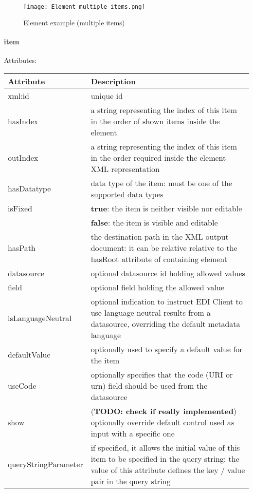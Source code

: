 \begin{figure}[h]
	\caption{Element example (multiple items)}
	\texttt{[image: Element multiple items.png]}
	\centering
\end{figure}


\paragraph{item} \label{item}

Attributes:
\begin{center}
	\begin{tabular}{ | p{} | p{} | }
		\hline
		Attribute & Description \\ 
		\hline
		xml:id & unique id \\
		\hline
		hasIndex & a string representing the index of this item in the order of shown items inside the element \\
		\hline
		outIndex & a string representing the index of this item in the order required inside the element XML representation \\
		\hline
		hasDatatype & data type of the item: must be one of the \hyperref[datatypes]{supported data types} \\
		\hline
		isFixed & \textbf{true}: the item is neither visible nor editable \\
		& \textbf{false}: the item is visible and editable \\
		\hline
		hasPath & the destination path in the XML output document: it can be relative relative to the hasRoot attribute of containing element \\
		\hline
		datasource & optional datasource id holding allowed values \\
		\hline
		field & optional field holding the allowed value \\
		\hline
		isLanguageNeutral & optional indication to instruct EDI Client to use language neutral results from a datasource, overriding the default metadata language \\
		\hline
		defaultValue & optionally used to 		specify a default value for the item \\
		\hline
		useCode & optionally specifies that the code (URI or urn) field should be used from the datasource \\
		\hline
		show & (\textbf{TODO: check if really implemented}) optionally override default control used as input with a specific one \\
		\hline
		queryStringParameter & if specified, it allows the initial value of this item to be specified in the query string: the value of this attribute defines the key / value pair in the query string \\
		\hline
	\end{tabular}
\end{center}

